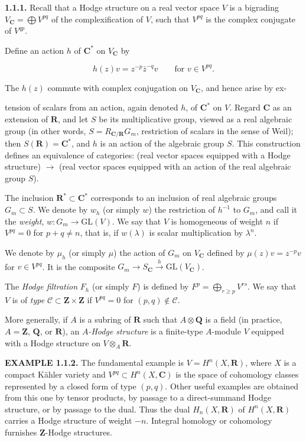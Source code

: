 \documentclass[10pt,a4paper]{article}
\newcommand{\SourcePage}[2]{\clearpage\setcounter{page}{#2}\typeout{D031_SOURCE_PAGE physical=#1 printed=#2}}
\begin{document}
\textbf{1.1.1.} Recall that a Hodge structure on a real vector space \(V\) is a bigrading \(V_{\mathbf C}=\bigoplus V^{pq}\) of the complexification of \(V\), such that \(V^{pq}\) is the complex conjugate of \(V^{qp}\).

Define an action \(h\) of \(\mathbf C^*\) on \(V_{\mathbf C}\) by

\[
\tag{1.1.1.1}
h(z)v=z^{-p}\bar z^{-q}v\qquad\text{for }v\in V^{pq}.
\]

The \(h(z)\) commute with complex conjugation on \(V_{\mathbf C}\), and hence arise by ex-

\SourcePage{6}{252}
tension of scalars from an action, again denoted \(h\), of \(\mathbf C^*\) on \(V\). Regard \(\mathbf C\) as an extension of \(\mathbf R\), and let \(S\) be its multiplicative group, viewed as a real algebraic group (in other words, \(S=R_{\mathbf C/\mathbf R}G_m\), restriction of scalars in the sense of Weil); then \(S(\mathbf R)=\mathbf C^*\), and \(h\) is an action of the algebraic group \(S\). This construction defines an equivalence of categories: (real vector spaces equipped with a Hodge structure) \(\to\) (real vector spaces equipped with an action of the real algebraic group \(S\)).

The inclusion \(\mathbf R^*\subset\mathbf C^*\) corresponds to an inclusion of real algebraic groups \(G_m\subset S\). We denote by \(w_h\) (or simply \(w\)) the restriction of \(h^{-1}\) to \(G_m\), and call it the \emph{weight}, \(w:G_m\to\mathrm{GL}(V)\). We say that \(V\) is homogeneous of weight \(n\) if \(V^{pq}=0\) for \(p+q\ne n\), that is, if \(w(\lambda)\) is scalar multiplication by \(\lambda^n\).

We denote by \(\mu_h\) (or simply \(\mu\)) the action of \(G_m\) on \(V_{\mathbf C}\) defined by \(\mu(z)v=z^{-p}v\) for \(v\in V^{pq}\). It is the composite \(G_m\to S_{\mathbf C}\xrightarrow{h}\mathrm{GL}(V_{\mathbf C})\).

The \emph{Hodge filtration} \(F_h\) (or simply \(F\)) is defined by \(F^p=\bigoplus_{r\ge p}V^{rs}\). We say that \(V\) is of \emph{type} \(\mathscr C\subset\mathbf Z\times\mathbf Z\) if \(V^{pq}=0\) for \((p,q)\notin\mathscr C\).

More generally, if \(A\) is a subring of \(\mathbf R\) such that \(A\otimes\mathbf Q\) is a field (in practice, \(A=\mathbf Z\), \(\mathbf Q\), or \(\mathbf R\)), an \emph{\(A\)-Hodge structure} is a finite-type \(A\)-module \(V\) equipped with a Hodge structure on \(V\otimes_A\mathbf R\).

\textbf{EXAMPLE 1.1.2.} The fundamental example is \(V=H^n(X,\mathbf R)\), where \(X\) is a compact Kähler variety and \(V^{pq}\subset H^n(X,\mathbf C)\) is the space of cohomology classes represented by a closed form of type \((p,q)\). Other useful examples are obtained from this one by tensor products, by passage to a direct-summand Hodge structure, or by passage to the dual. Thus the dual \(H_n(X,\mathbf R)\) of \(H^n(X,\mathbf R)\) carries a Hodge structure of weight \(-n\). Integral homology or cohomology furnishes \(\mathbf Z\)-Hodge structures.
\end{document}
